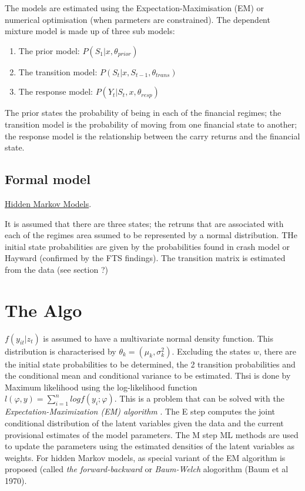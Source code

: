 \documentclass[12pt, a4paper, oneside]{article} %
\begin{document}
The models are estimated using the Expectation-Maximisation (EM) or numerical optimisation (when parmeters are constrained).  The dependent mixture model is made up of three sub models:  
\begin{enumerate}
\item The prior model: $P(S_1|x, \theta_{prior})$
\item The transition model: $P(S_t|x, S_{t-1}, \theta_{trans})$
\item The response model: $P(Y_t| S_t, x, \theta_{resp})$
\end{enumerate}
 
The prior states the probability of being in each of the financial regimes; the transition model is the probability of moving from one financial state to another; the response model is the relationship between the carry returns and the financial state.  


\subsection{Formal model}
\href{http://en.wikipedia.org/wiki/Hidden_Markov_model}{Hidden Markov Models}.  

It is assumed that there are three states; the retruns that are associated with each of the regimes area ssumed to be represented by a normal distribution. THe initial state probabilities are given by the probabilities found in crash model or Hayward (confirmed by the FTS findings).  The transition matrix is estimated from the data (see section ?)

\section{The Algo}
$f(y_{it}|z_t)$ is assumed to have a multivariate normal density function. This distribution is characterised by $\theta_k = (\mu_k, \sigma_k^2)$.  Excluding the states $w$, there are the initial state probabilities to be determined, the 2 transition probabilities and the conditional mean and conditional variance to be estimated.  Thsi is done by Maximum likelihood using the log-likelihood function $l(\varphi, y) = \sum_{i=1}^n log f(y_i; \varphi)$. This is a problem that can be solved with the \emph{Expectation-Maximization (EM) algorithm} \citet{dempster1977maximum}. The E step computes the joint conditional distribution of the latent variables given the data and the current provisional estimates of the model parameters. The M step ML methods are used to update the parameters using the estimated densities of the latent variables as weights. For hidden Markov models, as special variant of the EM algorithm is proposed (called \emph{the forward-backward} or \emph{Baum-Welch} alogorithm (Baum et al 1970).   
\end{document}

